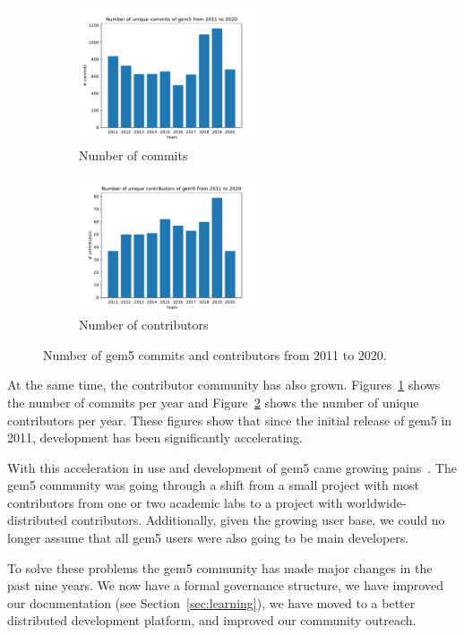 \begin{figure}
    \centering
    \begin{subfigure}{0.4\linewidth}
      \centering
      \includegraphics[height=4cm]{fig/gem5_commits}
      \caption{Number of commits}
      \label{fig:commits}
    \end{subfigure}
    \begin{subfigure}{0.4\linewidth}
      \centering
      \includegraphics[height=4cm]{fig/gem5_contributors}
      \caption{Number of contributors}
      \label{fig:contributors}
    \end{subfigure}
    \caption{Number of gem5 commits and contributors from 2011 to 2020.}
    \label{fig:gem5_commits_contributors}
\end{figure}

At the same time, the contributor community has also grown.
Figures~\ref{fig:commits} shows the number of commits per year and Figure~\ref{fig:contributors} shows the number of unique contributors per year.
These figures show that since the initial release of gem5 in 2011, development has been significantly accelerating.

With this acceleration in use and development of gem5 came growing pains~\cite{Power-gem5horrors-2015}.
The gem5 community was going through a shift from a small project with most contributors from one or two academic labs to a project with worldwide-distributed contributors.
Additionally, given the growing user base, we could no longer assume that all gem5 users were also going to be main developers.

To solve these problems the gem5 community has made major changes in the past nine years.
We now have a formal governance structure, we have improved our documentation (see Section~\ref{sec:learning}), we have moved to a better distributed development platform, and improved our community outreach.

